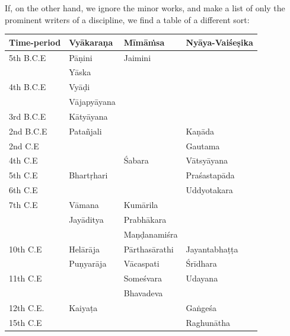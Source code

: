 If, on the other hand, we ignore the minor works, and make a list of only the prominent writers of a discipline, we find a table of a different sort: 
\begin{table}[H]
\centering
\tabcolsep=3pt
\renewcommand{\arraystretch}{1.2}
\begin{tabular}{|l|l|l|l|}
\hline
\textbf{Time-period} & \textbf{Vyākaraṇa}\index{Vyakarana@\textsl{Vyākaraṇa}} & \textbf{Mīmāṁsa}\index{Mimamsa@Mīmāṁsa} & \textbf{Nyāya-Vaiśeṣika}\index{Nyayavaisesika@Nyāya-Vaiśeṣika}\\\hline
5th B.C.E & Pāṇini\index{Panini@Pāṇini} & Jaimini\index{Jaimini}  & \\\hline
& Yāska\index{Yaska@Yāska} & & \\\hline
4th B.C.E & Vyāḍi\index{Vyadi@Vyāḍi} & & \\\hline
& Vājapyāyana\index{Vajapyayana@Vājapyāyana} & & \\\hline
3rd B.C.E & Kātyāyana\index{Katyayana@Kātyāyana} & & \\\hline
2nd B.C.E & Patañjali\index{Patanjali@Patañjali} & & Kaṇāda\index{Kanada@Kaṇāda}\\\hline
2nd C.E & & & Gautama\index{Gautama}\\\hline
4th C.E & & Śabara\index{Sabara@Śabara} & Vātsyāyana\index{Vatsyayana@Vātsyāyana}\\\hline
5th C.E & Bhartṛhari\index{Bhartrhari@Bhartṛhari} & & Praśastapāda\index{Prasastapada@Praśastapāda}\\\hline
6th C.E& & & Uddyotakara\\\hline
7th C.E & Vāmana\index{Vamana@Vāmana} & Kumārila\index{Kumarilabhatta@Kumārilabhaṭṭa} & \\\hline
& Jayāditya\index{Jayaditya@Jayāditya} & Prabhākara\index{Prabhakara@Prabhākara} & \\\hline
& & Maṇḍanamiśra\index{Mandanamisra@Maṇḍanamiśra} & \\\hline
10th C.E & Helārāja\index{Helaraja@Helārāja} & Pārthasārathi & Jayantabhaṭṭa\index{Jayantabhatta@Jayantabhaṭṭa}\\\hline
 & Puṇyarāja\index{Punyaraja@Puṇyarāja} & Vācaspati\index{Vacaspatimisra@Vācaspati Miśra} & Śrīdhara\\\hline
11th C.E & & Someśvara & Udayana\index{Udayana}\\\hline
& & Bhavadeva & \\\hline
12th C.E. & Kaiyaṭa\index{Kaiyata@Kaiyaṭa} & & Gaṅgeśa\index{Gangesa@Gaṅgeśa}\\\hline
15th C.E & & & Raghunātha\\\hline

\end{tabular}
\end{table}
